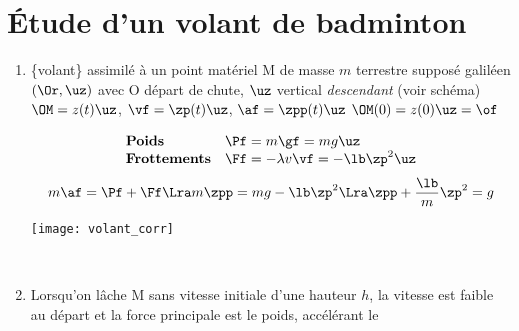 \documentclass[a4paper, 12pt, final, garamond]{book}
\begin{document}
\section{Étude d'un volant de badminton}
\begin{enumerate}
    \item 
        \begin{itemize}[label=$\diamond$, leftmargin=10pt]
             \{volant\} assimilé à un point matériel M de masse
                $m$
             terrestre supposé galiléen
             $(\Or, \uz)$ avec O départ de chute, $\uz$ vertical
                \textit{descendant} (voir schéma)
             $\OM = z(t)\uz$, $\vf = \zp(t)\uz$, $\af =
                \zpp(t)\uz$
             $\OM(0) = z(0)\uz = \of$
        \end{itemize}\smallbreak
        \begin{minipage}{0.70\linewidth}
            \begin{itemize}[label=$\diamond$, leftmargin=10pt]
                    \[
                        \begin{array}{ll}
                            \textbf{Poids} & \Pf = m\gf = mg\uz\\
                            \textbf{Frottements} & \Ff = -\lambda v\vf =
                            -\lb\zp^2\uz
                        \end{array}
                    \]
                    \[m\af = \Pf + \Ff \Lra m\zpp = mg -\lb\zp^2 \Lra \zpp +
                    \frac{\lb}{m}\zp^2 = g\]
            \end{itemize}
        \end{minipage}
        \begin{minipage}{0.25\linewidth}
            \hfill
            \begin{center}
                \texttt{[image: volant\_corr]}
            \end{center}
            \vspace{-30pt}
            \hfill~
        \end{minipage}\smallbreak
    \item Lorsqu'on lâche M sans vitesse initiale d'une hauteur $h$, la vitesse
        est faible au départ et la force principale est le poids, accélérant le

\end{enumerate}
\end{document}
